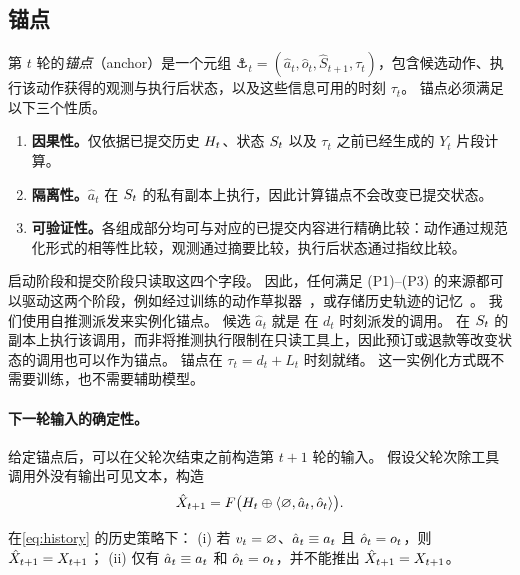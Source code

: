\subsection{锚点}
\label{sec:method:anchor}

\begin{definition}[锚点]
\label{def:anchor}
第 $t$ 轮的\emph{锚点}（anchor）是一个元组 $\anchor_t=(\hat a_t,\hat o_t,\hat S_{t+1},\tau_t)$，包含候选动作、执行该动作获得的观测与执行后状态，以及这些信息可用的时刻 $\tau_t$。
锚点必须满足以下三个性质。
\begin{enumerate}[label=(P\arabic*),leftmargin=*,nosep]
\item \textbf{因果性。}仅依据已提交历史 $H_t$、状态 $S_{t}$ 以及 $\tau_t$ 之前已经生成的 $Y_t$ 片段计算。
\item \textbf{隔离性。}$\hat a_t$ 在 $S_{t}$ 的私有副本上执行，因此计算锚点不会改变已提交状态。
\item \textbf{可验证性。}各组成部分均可与对应的已提交内容进行精确比较：动作通过规范化形式的相等性比较，观测通过摘要比较，执行后状态通过指纹比较。
\end{enumerate}
\end{definition}

启动阶段和提交阶段只读取这四个字段。
因此，任何满足 (P1)--(P3) 的来源都可以驱动这两个阶段，例如经过训练的动作草拟器~\citep{xu2026leap}，或存储历史轨迹的记忆~\citep{li2026specmemory}。
我们使用自推测派发来实例化锚点。
候选 $\hat a_t$ 就是 \spork 在 $d_t$ 时刻派发的调用。
\method 在 $S_{t}$ 的副本上执行该调用，而非将推测执行限制在只读工具上，因此预订或退款等改变状态的调用也可以作为锚点。
锚点在 $\tau_t=d_t+L_t$ 时刻就绪。
这一实例化方式既不需要训练，也不需要辅助模型。

\paragraph{下一轮输入的确定性。}
给定锚点后，可以在父轮次结束之前构造第 $t{+}1$ 轮的输入。
假设父轮次除工具调用外没有输出可见文本，\method 构造
\begin{equation}
  \hat X_{t+1} = F\big(H_t \oplus \langle \varnothing, \hat a_t, \hat o_t\rangle\big).
  \label{eq:spec-input}
\end{equation}

\begin{proposition}[下一轮输入的确定性]
\label{prop:determinacy}
在\cref{eq:history} 的历史策略下：
(i) 若 $v_{t}=\varnothing$、$\hat a_t\equiv a_{t}$ 且 $\hat o_t=o_{t}$，则 $\hat X_{t+1}=X_{t+1}$；
(ii) 仅有 $\hat a_t\equiv a_{t}$ 和 $\hat o_t=o_{t}$，并不能推出 $\hat X_{t+1}=X_{t+1}$。
\end{proposition}

